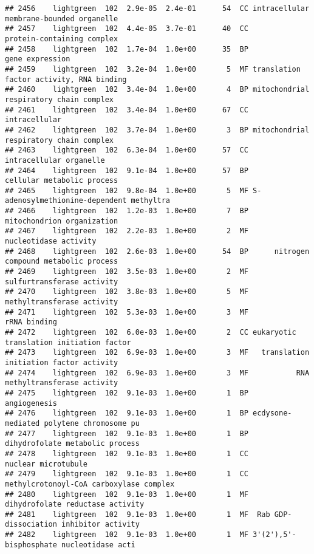 \documentclass[]{article}
\begin{document}
\begin{verbatim}
## 2456    lightgreen  102  2.9e-05  2.4e-01      54  CC intracellular membrane-bounded organelle
## 2457    lightgreen  102  4.4e-05  3.7e-01      40  CC               protein-containing complex
## 2458    lightgreen  102  1.7e-04  1.0e+00      35  BP                          gene expression
## 2459    lightgreen  102  3.2e-04  1.0e+00       5  MF translation factor activity, RNA binding
## 2460    lightgreen  102  3.4e-04  1.0e+00       4  BP mitochondrial respiratory chain complex 
## 2461    lightgreen  102  3.4e-04  1.0e+00      67  CC                            intracellular
## 2462    lightgreen  102  3.7e-04  1.0e+00       3  BP mitochondrial respiratory chain complex 
## 2463    lightgreen  102  6.3e-04  1.0e+00      57  CC                  intracellular organelle
## 2464    lightgreen  102  9.1e-04  1.0e+00      57  BP               cellular metabolic process
## 2465    lightgreen  102  9.8e-04  1.0e+00       5  MF S-adenosylmethionine-dependent methyltra
## 2466    lightgreen  102  1.2e-03  1.0e+00       7  BP               mitochondrion organization
## 2467    lightgreen  102  2.2e-03  1.0e+00       2  MF                    nucleotidase activity
## 2468    lightgreen  102  2.6e-03  1.0e+00      54  BP      nitrogen compound metabolic process
## 2469    lightgreen  102  3.5e-03  1.0e+00       2  MF               sulfurtransferase activity
## 2470    lightgreen  102  3.8e-03  1.0e+00       5  MF               methyltransferase activity
## 2471    lightgreen  102  5.3e-03  1.0e+00       3  MF                             rRNA binding
## 2472    lightgreen  102  6.0e-03  1.0e+00       2  CC eukaryotic translation initiation factor
## 2473    lightgreen  102  6.9e-03  1.0e+00       3  MF   translation initiation factor activity
## 2474    lightgreen  102  6.9e-03  1.0e+00       3  MF           RNA methyltransferase activity
## 2475    lightgreen  102  9.1e-03  1.0e+00       1  BP                             angiogenesis
## 2476    lightgreen  102  9.1e-03  1.0e+00       1  BP ecdysone-mediated polytene chromosome pu
## 2477    lightgreen  102  9.1e-03  1.0e+00       1  BP          dihydrofolate metabolic process
## 2478    lightgreen  102  9.1e-03  1.0e+00       1  CC                      nuclear microtubule
## 2479    lightgreen  102  9.1e-03  1.0e+00       1  CC  methylcrotonoyl-CoA carboxylase complex
## 2480    lightgreen  102  9.1e-03  1.0e+00       1  MF         dihydrofolate reductase activity
## 2481    lightgreen  102  9.1e-03  1.0e+00       1  MF  Rab GDP-dissociation inhibitor activity
## 2482    lightgreen  102  9.1e-03  1.0e+00       1  MF 3'(2'),5'-bisphosphate nucleotidase acti

\end{verbatim}
\end{document}
